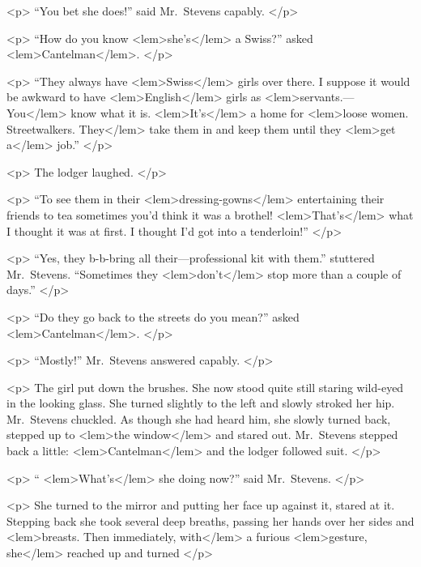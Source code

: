 {{				<p>
				“You bet she does!” said Mr.\ Stevens capably. 
 				</p> 

				<p>
				“How do you know 
<lem>she's</lem>{} a Swiss?” asked 
<lem>Cantelman</lem>{}. 
 				</p> 

				<p>
				“They always have 
<lem>Swiss</lem>
					{} 
				girls over there. I suppose it would be awkward to have 
<lem>English</lem>{} 
				girls as 
<lem>servants.---You</lem>{} know what it is. 
<lem>It's</lem>
					{} 
				a home for 
<lem>loose women. Streetwalkers. They</lem>
					{} 
				take them 
				in and keep them until they 
<lem>get a</lem>{} job.” 
 				</p> 

				<p>
				The lodger laughed. 
 				</p> 

				<p>
				“To see them in their 
<lem>dressing-gowns</lem>
					{} 
				entertaining their friends to tea sometimes you'd 
				think it was a brothel! 
<lem>That's</lem>
					{} 
				what I thought it was at first. I thought I'd got into 
				a tenderloin!” 
 				</p> 

				<p>
				“Yes, they b-b-bring all their---professional kit with them.” stuttered Mr.\ Stevens. 
				“Sometimes they 
<lem>don't</lem>
					{} 
				stop more than a couple of days.” 
 				</p> 

				<p>
				“Do they go back to the streets do you mean?” asked 
<lem>Cantelman</lem>{}. 
 				</p> 

				<p>
				“Mostly!” Mr.\ Stevens answered capably. 
 				</p> 

				<p>
				The girl put down the brushes. She now stood quite still staring wild-eyed in the looking 
				glass. She turned slightly to the left and slowly stroked her hip. Mr.\ Stevens chuckled. 
				As though she had heard him, she slowly turned back, stepped up to 
<lem>the window</lem>
					{} 
				and stared 
				out. Mr.\ Stevens stepped back a little: 
<lem>Cantelman</lem>{} and the lodger followed suit. 
 				</p> 

				<p>
				“
<lem>What's</lem>
					{} 
				she doing now?” said Mr.\ Stevens. 
 				</p> 

				<p>
				She turned to the  mirror and putting her face up against it, stared at it. 
				Stepping back she took several deep breaths, passing her hands over her 
				sides and 
<lem>breasts. Then immediately, with</lem>
					{} 
				a furious 
<lem>gesture, she</lem>
					{} 
				reached up and turned 
					{} 
				</p> 

}}
